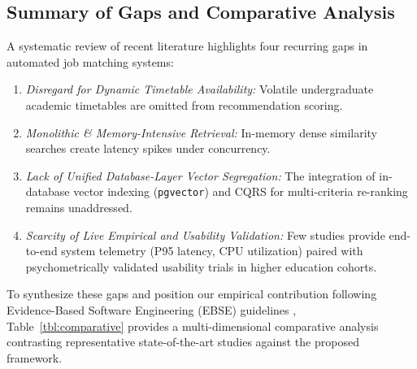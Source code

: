 \documentclass[a4paper,fleqn]{cas-dc}
\begin{document}
\subsection{Summary of Gaps and Comparative Analysis}
A systematic review of recent literature highlights four recurring gaps in automated job matching systems:
\begin{enumerate}
    \item \textit{Disregard for Dynamic Timetable Availability:} Volatile undergraduate academic timetables are omitted from recommendation scoring.
    \item \textit{Monolithic \& Memory-Intensive Retrieval:} In-memory dense similarity searches create latency spikes under concurrency.
    \item \textit{Lack of Unified Database-Layer Vector Segregation:} The integration of in-database vector indexing (\texttt{pgvector}) and CQRS for multi-criteria re-ranking remains unaddressed.
    \item \textit{Scarcity of Live Empirical and Usability Validation:} Few studies provide end-to-end system telemetry (P95 latency, CPU utilization) paired with psychometrically validated usability trials in higher education cohorts.
\end{enumerate}

To synthesize these gaps and position our empirical contribution following Evidence-Based Software Engineering (EBSE) guidelines \cite{alsaif2022, rebaza2025}, Table~\ref{tbl:comparative} provides a multi-dimensional comparative analysis contrasting representative state-of-the-art studies against the proposed framework.
\end{document}

